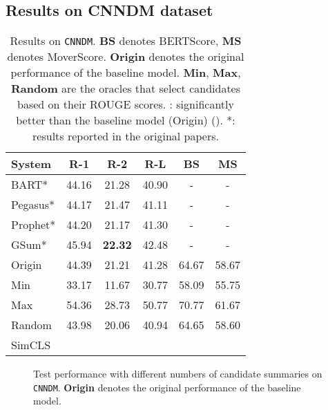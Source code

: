 \documentclass[11pt,a4paper]{article}
\begin{document}
\subsection{Results on CNNDM dataset}
\begin{table}[t!]
\small
\centering
\addtolength{\tabcolsep}{-1pt}  
\begin{tabular}{lccccc}
\toprule
\textbf{System} & \textbf{R-1} & \textbf{R-2} & \textbf{R-L} & \textbf{BS} & \textbf{MS} \\
\midrule
 BART* & 44.16 & 21.28 & 40.90 & - & -\\
 Pegasus* & 44.17 & 21.47 & 41.11 & - & - \\
 Prophet* & 44.20 & 21.17 & 41.30 & - & - \\
 GSum* & 45.94 & \textbf{22.32} & 42.48 & - & -\\
\midrule
 Origin & 44.39 & 21.21 & 41.28  & 64.67 & 58.67  \\
 Min & 33.17 & 11.67 & 30.77 & 58.09 & 55.75 \\
 Max & 54.36 & 28.73 & 50.77 & 70.77 & 61.67 \\
 Random & 43.98 & 20.06 & 40.94 & 64.65 & 58.60 \\
 \midrule
 SimCLS &  &  &  &  &  \\
\bottomrule
\end{tabular}
\addtolength{\tabcolsep}{+1pt} 
\caption{\label{tab:cnndm} Results on \texttt{CNNDM}.
\textbf{BS} denotes BERTScore, \textbf{MS} denotes MoverScore. 
\textbf{Origin} denotes the original performance of the baseline model.
\textbf{Min}, \textbf{Max}, \textbf{Random} are the oracles that select candidates based on their ROUGE scores.
\dag: significantly better than the baseline model (Origin) ().
*: results reported in the original papers.}
\end{table}

\begin{figure}
    \raggedright
    \caption{Test performance with different numbers of candidate summaries on \texttt{CNNDM}. \textbf{Origin} denotes the original performance of the baseline model.}
    \label{fig:num}
\end{figure}
\end{document}
